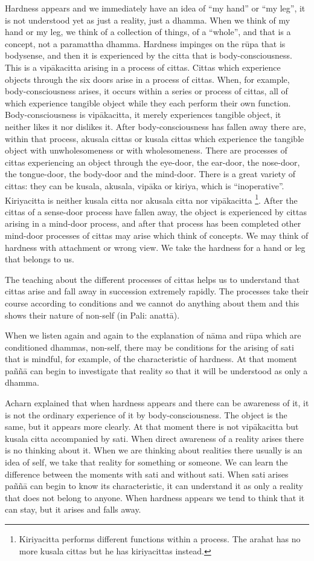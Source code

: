 Hardness appears and we immediately have an idea of ``my hand'' or ``my
leg'', it is not understood yet as just a reality, just a dhamma. When
we think of my hand or my leg, we think of a collection of things, of a
``whole'', and that is a concept, not a paramattha dhamma. Hardness
impinges on the rūpa that is bodysense, and then it is experienced by
the citta that is body-consciousness. This is a vipākacitta arising in a
process of cittas. Cittas which experience objects through the six doors
arise in a process of cittas. When, for example, body-consciousness
arises, it occurs within a series or process of cittas, all of which
experience tangible object while they each perform their own function.
Body-consciousness is vipākacitta, it merely experiences tangible
object, it neither likes it nor dislikes it. After body-consciousness
has fallen away there are, within that process, akusala cittas or kusala
cittas which experience the tangible object with unwholesomeness or with
wholesomeness. There are processes of cittas experiencing an object
through the eye-door, the ear-door, the nose-door, the tongue-door, the
body-door and the mind-door. There is a great variety of cittas: they
can be kusala, akusala, vipāka or kiriya, which is ``inoperative''.
Kiriyacitta is neither kusala citta nor akusala citta nor vipākacitta
\footnote{Kiriyacitta performs different
functions within a process. The arahat has no more kusala cittas but he
has kiriyacittas instead.}.
After the cittas of a sense-door process have fallen away, the object is
experienced by cittas arising in a mind-door process, and after that
process has been completed other mind-door processes of cittas may arise
which think of concepts. We may think of hardness with attachment or
wrong view. We take the hardness for a hand or leg that belongs to us.

The teaching about the different processes of cittas helps us to
understand that cittas arise and fall away in succession extremely
rapidly. The processes take their course according to conditions and we
cannot do anything about them and this shows their nature of non-self
(in Pali: anattā).

When we listen again and again to the explanation of nāma and rūpa which
are conditioned dhammas, non-self, there may be conditions for the
arising of sati that is mindful, for example, of the characteristic of
hardness. At that moment paññā can begin to investigate that reality so
that it will be understood as only a dhamma.

Acharn explained that when hardness appears and there can be awareness
of it, it is not the ordinary experience of it by body-consciousness.
The object is the same, but it appears more clearly. At that moment
there is not vipākacitta but kusala citta accompanied by sati. When
direct awareness of a reality arises there is no thinking about it. When
we are thinking about realities there usually is an idea of self, we
take that reality for something or someone. We can learn the difference
between the moments with sati and without sati. When sati arises paññā
can begin to know its characteristic, it can understand it as only a
reality that does not belong to anyone. When hardness appears we tend to
think that it can stay, but it arises and falls away.

